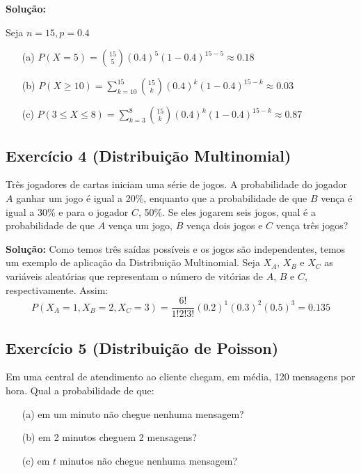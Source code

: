 \documentclass{article}
\begin{document}
\vspace{0.5cm}
\textbf{Solução:}

Seja $n=15, p=0.4$
\begin{enumerate}
    \item[(a)] $P(X=5) = \binom{15}{5}(0.4)^5 (1-0.4)^{15-5} \approx 0.18$
    \item[(b)] $P(X \geq 10) = \sum_{k=10}^{15} \binom{15}{k}(0.4)^k (1-0.4)^{15-k} \approx 0.03$
    \item[(c)] $P(3 \leq X \leq 8) = \sum_{k=3}^{8} \binom{15}{k}(0.4)^k (1-0.4)^{15-k} \approx 0.87$
\end{enumerate}

\subsection{Exercício 4 (Distribuição Multinomial)}
Três jogadores de cartas iniciam uma série de jogos. 
A probabilidade do jogador $A$ ganhar um jogo é igual a 20\%, 
enquanto que a probabilidade de que $B$ vença é igual a 30\% 
e para o jogador $C$, 50\%. 
Se eles jogarem seis jogos, qual é a probabilidade de que 
$A$ vença um jogo, $B$ vença dois jogos e $C$ vença três jogos?

\vspace{0.5cm}
\textbf{Solução:} 
Como temos três saídas possíveis e os jogos são independentes, 
temos um exemplo de aplicação da Distribuição Multinomial. 
Seja $X_A$, $X_B$ e $X_C$ as variáveis aleatórias que 
representam o número de vitórias de $A$, $B$ e $C$, respectivamente. 
Assim:
    $$
    P(X_A = 1, X_B = 2, X_C = 3) 
    = \frac{6!}{1! 2! 3!}(0.2)^1 (0.3)^2 (0.5)^3 
    = 0.135
    $$

\subsection{Exercício 5 (Distribuição de Poisson)}
Em uma central de atendimento ao cliente chegam, em média, 120 mensagens por hora. Qual a probabilidade de que:
\begin{enumerate}
    \item[(a)] em um minuto não chegue nenhuma mensagem?
    \item[(b)] em 2 minutos cheguem 2 mensagens?
    \item[(c)] em $t$ minutos não chegue nenhuma mensagem?
\end{enumerate}
\end{document}
